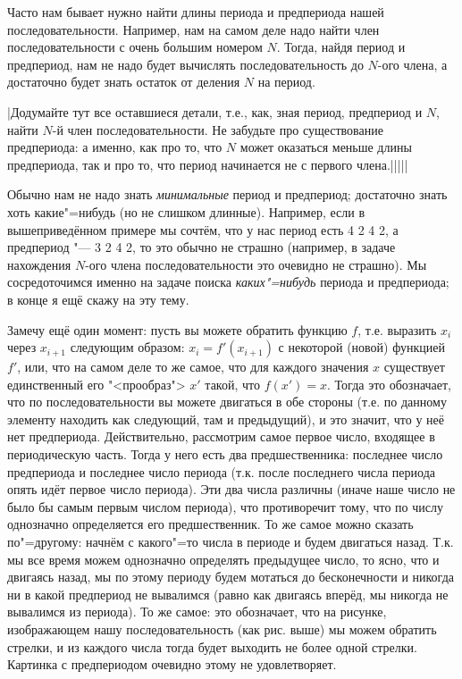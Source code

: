 Часто нам бывает нужно найти длины периода и предпериода нашей последовательности. Например, 
нам на самом деле надо найти член последовательности с очень большим номером $N$. Тогда, найдя
период и предпериод, нам не надо будет вычислять последовательность до $N$-ого члена, а 
достаточно будет знать остаток от деления $N$ на период.

\task|Додумайте тут все оставшиеся детали, т.е., как, зная период, предпериод и 
$N$, найти $N$-й член последовательности. Не забудьте про существование предпериода: а именно, как 
про то, что $N$ может оказаться меньше длины предпериода, так и про то, что период начинается 
не с первого члена.|||||

Обычно нам не надо знать \textit{минимальные} период и предпериод; достаточно знать хоть 
какие"=нибудь (но не слишком длинные). Например, если в вышеприведённом примере мы сочтём, что 
у нас период есть 4 2 4 2, а предпериод "--- 3 2 4 2, то это обычно не страшно (например, в 
задаче нахождения $N$-ого члена последовательности это очевидно не страшно). Мы сосредоточимся 
именно на задаче поиска \textit{каких"=нибудь} периода и предпериода; в конце я ещё скажу на эту тему.

Замечу ещё один момент: пусть вы можете обратить функцию $f$, т.е. выразить $x_i$ через 
$x_{i+1}$ следующим образом: $x_i=f'(x_{i+1})$ с некоторой (новой) функцией $f'$, или, что на самом 
деле то же самое, что для каждого значения $x$ 
существует единственный его "<прообраз"> $x'$ такой, что $f(x')=x$. Тогда это обозначает, что 
по последовательности вы можете двигаться в обе стороны (т.е. по данному элементу находить как 
следующий, там и предыдущий), и это значит, что у неё нет предпериода. Действительно, рассмотрим 
самое первое число, входящее в периодическую часть. Тогда у него есть два 
предшественника: последнее число предпериода и последнее число периода (т.к. после последнего 
числа периода опять идёт первое число периода). Эти два числа различны (иначе наше число не 
было бы самым первым числом периода), что противоречит тому, что по числу однозначно 
определяется его предшественник. То же самое можно сказать по"=другому: начнём с какого"=то 
числа в периоде и будем двигаться назад. Т.к. мы все время можем однозначно определять 
предыдущее число, то ясно, что и двигаясь назад, мы по этому периоду будем мотаться до 
бесконечности и никогда ни в какой предпериод не вывалимся (равно как двигаясь вперёд, мы 
никогда не вывалимся из периода). То же самое: это обозначает, что на рисунке, изображающем 
нашу последовательность (как рис. выше) мы можем обратить стрелки, и из каждого числа тогда 
будет выходить не более одной стрелки. Картинка с предпериодом очевидно этому не 
удовлетворяет.

